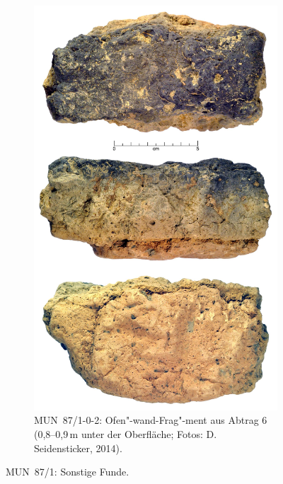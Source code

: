 \begin{figure}[p]
\begin{subfigure}{\columnwidth}
		\includegraphics[height = .4\textheight]{fig/MUN87-1-0-2-6_Ofenwand.jpg}
		\caption{MUN~87/1-0-2: Ofen"-wand-Frag"-ment aus Abtrag 6 (0,8--0,9\,m unter der Oberfläche; Fotos: D. Seidensticker, 2014).}
		\label{fig:MUN87-1_Ofenwand}
	\end{subfigure}
	\caption{MUN~87/1: Sonstige Funde.}
\end{figure}

